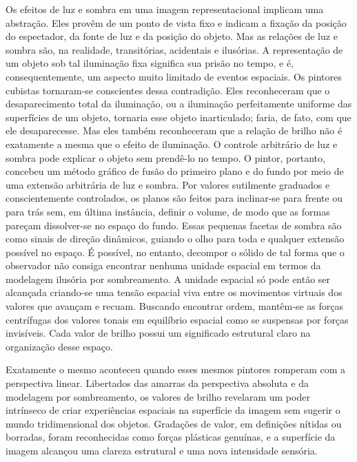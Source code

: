 \documentclass[a4paper]{article}
\begin{document}
Os efeitos de luz e sombra em uma imagem representacional implicam uma abstração. Eles provêm de um ponto de vista fixo e indicam a fixação da posição do espectador, da fonte de luz e da posição do objeto. Mas as relações de luz e sombra são, na realidade, transitórias, acidentais e ilusórias. A representação de um objeto sob tal iluminação fixa significa sua prisão no tempo, e é, consequentemente, um aspecto muito limitado de eventos espaciais. Os pintores cubistas tornaram-se conscientes dessa contradição. Eles reconheceram que o desaparecimento total da iluminação, ou a iluminação perfeitamente uniforme das superfícies de um objeto, tornaria esse objeto inarticulado; faria, de fato, com que ele desaparecesse. Mas eles também reconheceram que a relação de brilho não é exatamente a mesma que o efeito de iluminação. O controle arbitrário de luz e sombra pode explicar o objeto sem prendê-lo no tempo. O pintor, portanto, concebeu um método gráfico de fusão do primeiro plano e do fundo por meio de uma extensão arbitrária de luz e sombra. Por valores sutilmente graduados e conscientemente controlados, os planos são feitos para inclinar-se para frente ou para trás sem, em última instância, definir o volume, de modo que as formas pareçam dissolver-se no espaço do fundo. Essas pequenas facetas de sombra são como sinais de direção dinâmicos, guiando o olho para toda e qualquer extensão possível no espaço. É possível, no entanto, decompor o sólido de tal forma que o observador não consiga encontrar nenhuma unidade espacial em termos da modelagem ilusória por sombreamento. A unidade espacial só pode então ser alcançada criando-se uma tensão espacial viva entre os movimentos virtuais dos valores que avançam e recuam. Buscando encontrar ordem, mantêm-se as forças centrífugas dos valores tonais em equilíbrio espacial como se suspensas por forças invisíveis. Cada valor de brilho possui um significado estrutural claro na organização desse espaço.

Exatamente o mesmo aconteceu quando esses mesmos pintores romperam com a perspectiva linear. Libertados das amarras da perspectiva absoluta e da modelagem por sombreamento, os valores de brilho revelaram um poder intrínseco de criar experiências espaciais na superfície da imagem sem sugerir o mundo tridimensional dos objetos. Gradações de valor, em definições nítidas ou borradas, foram reconhecidas como forças plásticas genuínas, e a superfície da imagem alcançou uma clareza estrutural e uma nova intensidade sensória.

\vspace*{\fill}
\end{document}
